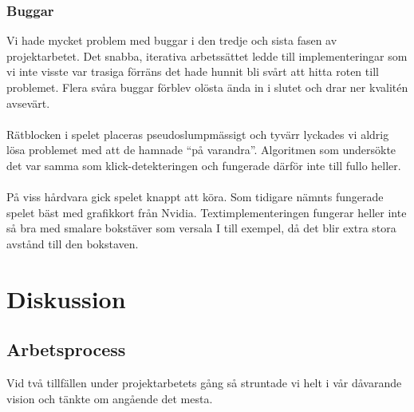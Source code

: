 \documentclass[a4paper]{article}
\begin{document}
\subsubsection{Buggar}
Vi hade mycket problem med buggar i den tredje och sista fasen av projektarbetet. Det snabba, iterativa arbetssättet ledde till implementeringar som vi inte visste var trasiga förräns det hade hunnit bli svårt att hitta roten till problemet. Flera svåra buggar förblev olösta ända in i slutet och drar ner kvalitén avsevärt.
\\
\\
Rätblocken i spelet placeras pseudoslumpmässigt och tyvärr lyckades vi aldrig lösa problemet med att de hamnade “på varandra”. Algoritmen som undersökte det var samma som klick-detekteringen och fungerade därför inte till fullo heller.
\\
\\
På viss hårdvara gick spelet knappt att köra. Som tidigare nämnts fungerade spelet bäst med grafikkort från Nvidia. Textimplementeringen fungerar heller inte så bra med smalare bokstäver som versala I till exempel, då det blir extra stora avstånd till den bokstaven.


\newpage
\section{Diskussion}
\subsection{Arbetsprocess}
Vid två tillfällen under projektarbetets gång så struntade vi helt i vår dåvarande vision och tänkte om angående det mesta. 
\end{document}
